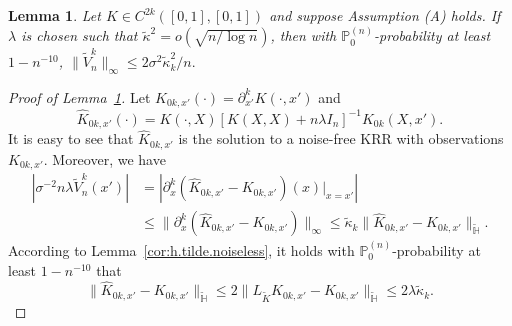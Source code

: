 \documentclass[10pt,a4paper]{amsart}
\newtheorem{lemma}{Lemma}
\newcommand{\PP}{\mathbb{P}}
\newcommand{\bbH}{\mathbb{H}}
\begin{document}
\begin{lemma}\label{thm:equivalent.sigma.deriv}
Let $K\in C^{2k}([0,1],[0,1])$ and suppose Assumption (A) holds. If $\lambda$ is chosen such that $\tilde{\kappa}^2=o(\sqrt{n/\log n})$, then with $\PP_0^{(n)}$-probability at least $1 - n^{-10}$, 
$\|\tilde{V}^{k}_{n}\|_\infty \leq {2\sigma^2\tilde{\kappa}_{k}^2}/{n}.$
\end{lemma}

\begin{proof}[Proof of Lemma~\ref{thm:equivalent.sigma.deriv}]
Let $K_{0k,x'}(\cdot)=\partial_{x'}^kK(\cdot,x')$ and 
$$\hat{K}_{0k,x'}(\cdot)=K(\cdot, X)[K(X, X) + n \lambda I_n]^{-1} K_{0k}(X, x').$$ 
It is easy to see that $\hat{K}_{0k,x'}$ is the solution to a noise-free KRR with observations $K_{0k,x'}$. Moreover, we have
\begin{equation}\label{eq:tilde.variance}
\begin{split}
|\sigma^{-2}n\lambda\tilde{V}^{k}_{n}(x')| &= \left|\partial^k_{x}(\hat{K}_{0k,x'}-K_{0k,x'})(x)|_{x=x'}\right|\\
&\leq \|\partial^k_{x}(\hat{K}_{0k,x'}-K_{0k,x'})\|_\infty \leq \tilde{\kappa}_{k}
\|\hat{K}_{0k,x'}-K_{0k,x'}\|_{\tilde{\bbH}}.
\end{split}
\end{equation}
According to Lemma~\ref{cor:h.tilde.noiseless}, it holds with $\PP_0^{(n)}$-probability at least $1 - n^{-10}$  that
\begin{equation}
\|\hat{K}_{0k,x'}-K_{0k,x'}\|_{\tilde{\bbH}}\leq 2\|L_{\tilde{K}}K_{0k,x'}-K_{0k,x'}\|_{\tilde{\bbH}} \leq 2\lambda \tilde{\kappa}_{k}.
\end{equation}
\end{proof}
\end{document}
